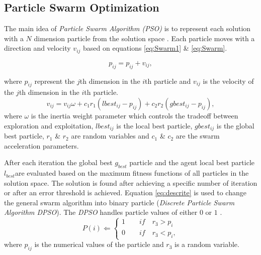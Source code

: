 \documentclass[a4paper,twoside]{article}
\begin{document}
\subsection{Particle Swarm Optimization}
\label{sec:ParticleSwarmAlgorithm}
 The main idea of \textit{Particle Swarm Algorithm (PSO)} is to represent each solution with a $N$ dimension particle from the solution space \cite{PSOFirst}. Each particle moves with a direction and velocity $v_{ij}$ based on equations \ref{eq:Swarm1} \& \ref{eq:Swarm}.

\begin{equation}
p_{ij}=p_{ij}+v_{ij},
\label{eq:Swarm1}
\end{equation}

where $p_{ij}$ represent the $j$th dimension in the $i$th particle and $v_{ij}$ is the velocity of the $j$th dimension in the $i$th particle.
 \begin{equation}
v_{ij}  = v_{ij} \omega + c_1 r_1 (lbest_{ij}  - p_{ij} ) + c_2 r_2 (gbest_{ij}  - p_{ij} ),
\label{eq:Swarm}
\end{equation}
 where $\omega$ is the inertia weight parameter which controls the tradeoff between exploration and exploitation,  $lbest_{ij}$ is the local best particle, $gbest_{ij}$ is the global best particle, $r_1$ \& $r_2$ are random variables and $c_1$ \& $c_2$ are the swarm acceleration parameters.

 After each iteration the global best $g_{best}$ particle and the agent local best particle $l_{best}$are evaluated based on the maximum fitness functions of all particles in the solution space. The solution is found after achieving a specific number of iteration or after an error threshold is achieved. Equation \ref{eq:descrite} is used to change the general swarm algorithm into binary particle (\textit{Discrete Particle Swarm Algorithm DPSO}). The \textit{DPSO} handles particle values of either $0$ or $1$ \cite{PSODisceret}.
\begin{equation}
   P(i)\Leftarrow
\left \{
\begin{array}{c}
1 \quad \quad if\quad r_{3}>p_{i}  \\

0 \quad \quad if\quad r_{3}<p_{i},
\label{eq:descrite}
\end{array}\right.
\end{equation}
 where $p_{ij}$ is the numerical values of the particle and $r_{3}$ is a random variable.
\end{document}
